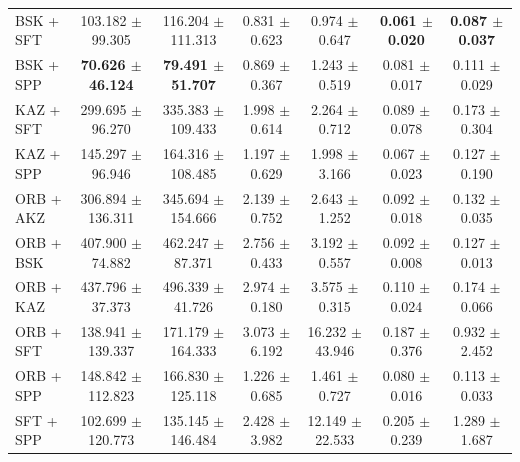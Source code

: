\begin{table}[hbp]
\begin{tabular}{lcccccc}
BSK + SFT & 103.182 $\pm$ 99.305 & 116.204 $\pm$ 111.313 & 0.831 $\pm$ 0.623 & 0.974 $\pm$ 0.647 & \textbf{0.061 $\pm$ 0.020} & \textbf{0.087 $\pm$ 0.037} \\
BSK + SPP & \textbf{70.626 $\pm$ 46.124} & \textbf{79.491 $\pm$ 51.707} & 0.869 $\pm$ 0.367 & 1.243 $\pm$ 0.519 & 0.081 $\pm$ 0.017 & 0.111 $\pm$ 0.029 \\
KAZ + SFT & 299.695 $\pm$ 96.270 & 335.383 $\pm$ 109.433 & 1.998 $\pm$ 0.614 & 2.264 $\pm$ 0.712 & 0.089 $\pm$ 0.078 & 0.173 $\pm$ 0.304 \\
KAZ + SPP & 145.297 $\pm$ 96.946 & 164.316 $\pm$ 108.485 & 1.197 $\pm$ 0.629 & 1.998 $\pm$ 3.166 & 0.067 $\pm$ 0.023 & 0.127 $\pm$ 0.190 \\
ORB + AKZ & 306.894 $\pm$ 136.311 & 345.694 $\pm$ 154.666 & 2.139 $\pm$ 0.752 & 2.643 $\pm$ 1.252 & 0.092 $\pm$ 0.018 & 0.132 $\pm$ 0.035 \\
ORB + BSK & 407.900 $\pm$ 74.882 & 462.247 $\pm$ 87.371 & 2.756 $\pm$ 0.433 & 3.192 $\pm$ 0.557 & 0.092 $\pm$ 0.008 & 0.127 $\pm$ 0.013 \\
ORB + KAZ & 437.796 $\pm$ 37.373 & 496.339 $\pm$ 41.726 & 2.974 $\pm$ 0.180 & 3.575 $\pm$ 0.315 & 0.110 $\pm$ 0.024 & 0.174 $\pm$ 0.066 \\
ORB + SFT & 138.941 $\pm$ 139.337 & 171.179 $\pm$ 164.333 & 3.073 $\pm$ 6.192 & 16.232 $\pm$ 43.946 & 0.187 $\pm$ 0.376 & 0.932 $\pm$ 2.452 \\
ORB + SPP & 148.842 $\pm$ 112.823 & 166.830 $\pm$ 125.118 & 1.226 $\pm$ 0.685 & 1.461 $\pm$ 0.727 & 0.080 $\pm$ 0.016 & 0.113 $\pm$ 0.033 \\
SFT + SPP & 102.699 $\pm$ 120.773 & 135.145 $\pm$ 146.484 & 2.428 $\pm$ 3.982 & 12.149 $\pm$ 22.533 & 0.205 $\pm$ 0.239 & 1.289 $\pm$ 1.687 \\
\bottomrule
\end{tabular}
\end{table}